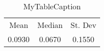 \documentclass[10pt]{article}
\begin{document}
\begin{table}
\centering
\begin{tabular}{ccc}
Mean & Median & St. Dev \\
0.0930 & 0.0670 & 0.1550 \\
\end{tabular}
\caption{MyTableCaption}
\label{table:MyTableLabel}
\end{table}
\end{document}

